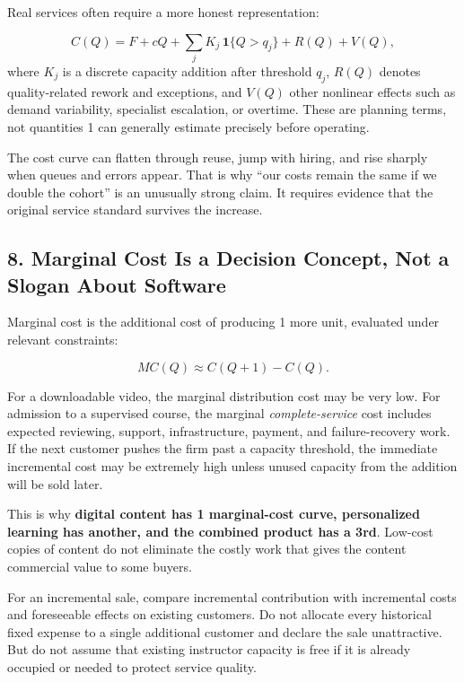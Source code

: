 Real services often require a more honest representation:

\begin{equation}
C(Q) = F + cQ + \sum_j K_j\,\mathbf{1}\{Q>q_j\} + R(Q) + V(Q),
\end{equation}
where $K_j$ is a discrete capacity addition after threshold $q_j$, $R(Q)$ denotes quality-related rework and exceptions, and $V(Q)$ other nonlinear effects such as demand variability, specialist escalation, or overtime. These are planning terms, not quantities 1 can generally estimate precisely before operating.

The cost curve can flatten through reuse, jump with hiring, and rise sharply when queues and errors appear. That is why ``our costs remain the same if we double the cohort'' is an unusually strong claim. It requires evidence that the original service standard survives the increase.

\subsection*{8. Marginal Cost Is a Decision Concept, Not a Slogan About Software}

Marginal cost is the additional cost of producing 1 more unit, evaluated under relevant constraints:

\begin{equation}
MC(Q) \approx C(Q+1) - C(Q).
\end{equation}

For a downloadable video, the marginal distribution cost may be very low. For admission to a supervised course, the marginal \emph{complete-service} cost includes expected reviewing, support, infrastructure, payment, and failure-recovery work. If the next customer pushes the firm past a capacity threshold, the immediate incremental cost may be extremely high unless unused capacity from the addition will be sold later.

This is why \textbf{digital content has 1 marginal-cost curve, personalized learning has another, and the combined product has a 3rd}. Low-cost copies of content do not eliminate the costly work that gives the content commercial value to some buyers.

For an incremental sale, compare incremental contribution with incremental costs and foreseeable effects on existing customers. Do not allocate every historical fixed expense to a single additional customer and declare the sale unattractive. But do not assume that existing instructor capacity is free if it is already occupied or needed to protect service quality.

